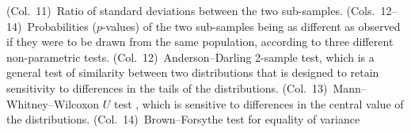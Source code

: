\begin{tabular}
{  (Col.~11)~Ratio of standard deviations between the two sub-samples.
  (Cols.~12--14)~Probabilities (\(p\)-values) of the two sub-samples being as different as observed if they were to be drawn from the same population, according to three different non-parametric tests.
  (Col.~12)~Anderson--Darling 2-sample test, which is a general test of similarity between two distributions that is designed to retain sensitivity to differences in the tails of the distributions.
  (Col.~13)~Mann--Whitney--Wilcoxon \(U\) test \citep{Mann:1947a}, which is sensitive to differences in the central value of the distributions.
  (Col.~14)~Brown--Forsythe test for equality of variance \citep{Brown:1974a}
}
\end{tabular}
